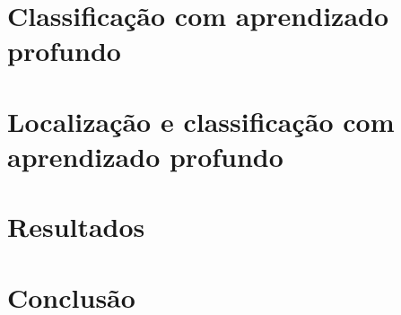 \documentclass[a5paper]{ufsc-thesis}  %
\begin{document}
\pretextual%
\imprimircapa%
\imprimirfolhaderosto*%
\clearpage
\imprimirfichacatalografica%
\clearpage
\tableofcontents%
\textual%




\chapter{Classificação com aprendizado profundo}
\chapter{Localização e classificação com aprendizado profundo}
\chapter{Resultados}
\chapter{Conclusão}
\end{document}
